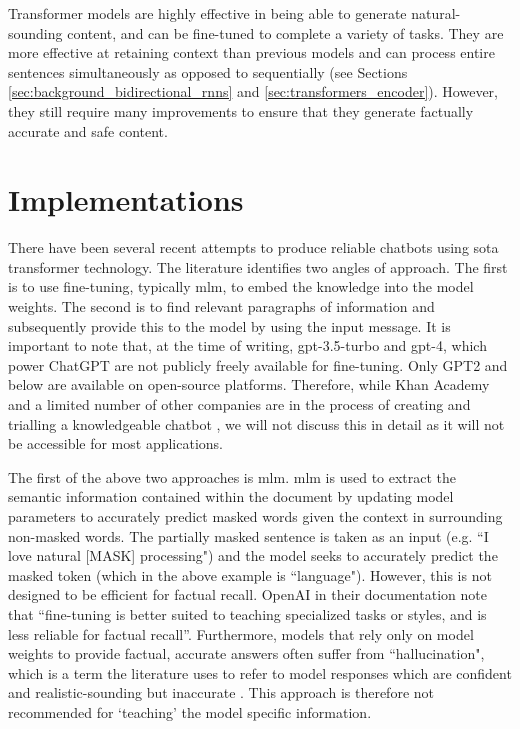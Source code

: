 Transformer models are highly effective in being able to generate natural-sounding content, and can be fine-tuned to complete a variety of tasks. They are more effective at retaining context than previous models and can process entire sentences simultaneously as opposed to sequentially (see Sections \ref{sec:background_bidirectional_rnns} and \ref{sec:transformers_encoder}). However, they still require many improvements to ensure that they generate factually accurate and safe content.

\section{Implementations}\label{sec:background_implementations}
There have been several recent attempts to produce reliable chatbots using \acrlong{sota} transformer technology. The literature identifies two angles of approach. The first is to use fine-tuning, typically \acrfull{mlm}, to embed the knowledge into the model weights. The second is to find relevant paragraphs of information and subsequently provide this to the model by using the input message. It is important to note that, at the time of writing, \acrshort{gpt}-3.5-turbo and \acrshort{gpt}-4, which power ChatGPT \citep{ChatGPTrelease} are not publicly freely available for fine-tuning. Only GPT2 and below are available on open-source platforms. Therefore, while Khan Academy and a limited number of other companies are in the process of creating and trialling a knowledgeable chatbot \citep{khanAcademy}, we will not discuss this in detail as it will not be accessible for most applications. 

The first of the above two approaches is \acrfull{mlm}. \acrshort{mlm} is used to extract the semantic information contained within the document by updating model parameters to accurately predict masked words given the context in surrounding non-masked words. The partially masked sentence is taken as an input (e.g. ``I love natural [MASK] processing") and the model seeks to accurately predict the masked token (which in the above example is ``language"). However, this is not designed to be efficient for factual recall. OpenAI in their documentation note that ``fine-tuning is better suited to teaching specialized tasks or styles, and is less reliable for factual recall''. Furthermore, models that rely only on model weights to provide factual, accurate answers often suffer from ``hallucination", which is a term the literature uses to refer to model responses which are confident and realistic-sounding but inaccurate \citep{manakul2023selfcheckgpt}. This approach is therefore not recommended for `teaching' the model specific information.

